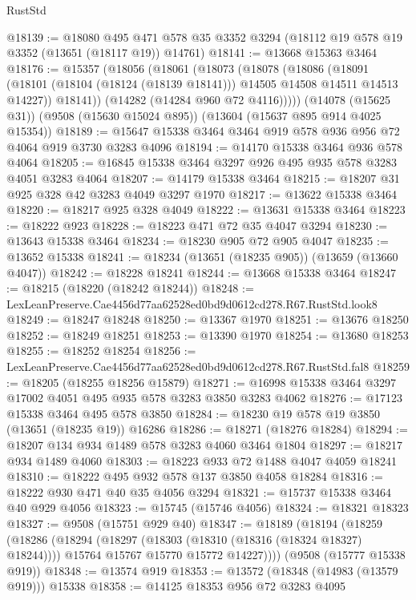 \begin{lexlean}{RustStd}
\begin{coremodule}
@18139 := @18080
    @495
    @471
    @578
    @35
    @3352
    @3294
    (@18112 @19 @578 @19 @3352 (@13651 (@18117 @19)) @14761)
@18141 := @13668 @15363 @3464
@18176 := @15357
    (@18056
      (@18061
        (@18073
          (@18078
            (@18086
              (@18091 (@18101 (@18104 (@18124 (@18139 @18141))) @14505 @14508 @14511 @14513 @14227))
              @18141))
          (@14282 (@14284 @960 @72 @4116)))))
    (@14078 (@15625 @31))
    (@9508 (@15630 @15024 @895))
    (@13604 (@15637 @895 @914 @4025 @15354))
@18189 := @15647 @15338 @3464 @3464 @919 @578 @936 @956 @72 @4064 @919 @3730 @3283 @4096
@18194 := @14170 @15338 @3464 @936 @578 @4064
@18205 := @16845 @15338 @3464 @3297 @926 @495 @935 @578 @3283 @4051 @3283 @4064
@18207 := @14179 @15338 @3464
@18215 := @18207 @31 @925 @328 @42 @3283 @4049 @3297 @1970
@18217 := @13622 @15338 @3464
@18220 := @18217 @925 @328 @4049
@18222 := @13631 @15338 @3464
@18223 := @18222 @923
@18228 := @18223 @471 @72 @35 @4047 @3294
@18230 := @13643 @15338 @3464
@18234 := @18230 @905 @72 @905 @4047
@18235 := @13652 @15338
@18241 := @18234 (@13651 (@18235 @905)) (@13659 (@13660 @4047))
@18242 := @18228 @18241
@18244 := @13668 @15338 @3464
@18247 := @18215 (@18220 (@18242 @18244))
@18248 := LexLeanPreserve.Cae4456d77aa62528ed0bd9d0612cd278.R67.RustStd.look8
@18249 := @18247 @18248
@18250 := @13367 @1970
@18251 := @13676 @18250
@18252 := @18249 @18251
@18253 := @13390 @1970
@18254 := @13680 @18253
@18255 := @18252 @18254
@18256 := LexLeanPreserve.Cae4456d77aa62528ed0bd9d0612cd278.R67.RustStd.fal8
@18259 := @18205 (@18255 @18256 @15879)
@18271 := @16998 @15338 @3464 @3297 @17002 @4051 @495 @935 @578 @3283 @3850 @3283 @4062
@18276 := @17123 @15338 @3464 @495 @578 @3850
@18284 := @18230 @19 @578 @19 @3850 (@13651 (@18235 @19)) @16286
@18286 := @18271 (@18276 @18284)
@18294 := @18207 @134 @934 @1489 @578 @3283 @4060 @3464 @1804
@18297 := @18217 @934 @1489 @4060
@18303 := @18223 @933 @72 @1488 @4047 @4059 @18241
@18310 := @18222 @495 @932 @578 @137 @3850 @4058 @18284
@18316 := @18222 @930 @471 @40 @35 @4056 @3294
@18321 := @15737 @15338 @3464 @40 @929 @4056
@18323 := @15745 (@15746 @4056)
@18324 := @18321 @18323
@18327 := @9508 (@15751 @929 @40)
@18347 := @18189
    (@18194
      (@18259
        (@18286
          (@18294
            (@18297 (@18303 (@18310 (@18316 (@18324 @18327) @18244))))
            @15764
            @15767
            @15770
            @15772
            @14227))))
    (@9508 (@15777 @15338 @919))
@18348 := @13574 @919
@18353 := @13572 (@18348 (@14983 (@13579 @919))) @15338
@18358 := @14125 @18353 @956 @72 @3283 @4095

\end{coremodule}
\end{lexlean}
